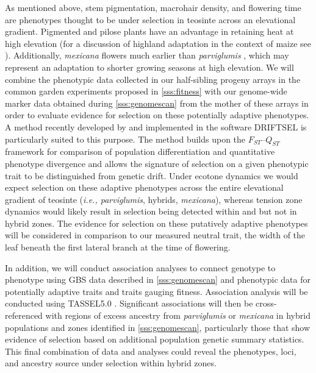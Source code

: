 As mentioned above, stem pigmentation, macrohair density, and flowering time are phenotypes thought to be under selection in teosinte across an elevational gradient.
Pigmented and pilose plants have an advantage in retaining heat at high elevation (for a discussion of highland adaptation in the context of maize see \citealt{Eagles1994}).
Additionally, \emph{mexicana} flowers much earlier than \emph{parviglumis} \citep{Rodriguez2006}, which may represent an adaptation to shorter growing seasons at high elevation.
We will combine the phenotypic data collected in our half-sibling progeny arrays in the common garden experiments proposed in \ref{sss:fitness} with our genome-wide marker data obtained during \ref{sss:genomescan} from the mother of these arrays in order to evaluate evidence for selection on these potentially adaptive phenotypes.
A method recently developed by \citet{Ovaskainen2011} and implemented in the software DRIFTSEL \citep{Karhunen2013} is particularly suited to this purpose.
The method builds upon the $F_{ST}$--$Q_{ST}$ framework \citep{leinonen2013} for comparison of population differentiation and quantitative phenotype divergence and allows the signature of selection on a given phenotypic trait to be distinguished from genetic drift.
Under ecotone dynamics we would expect selection on these adaptive phenotypes across the entire elevational gradient of teosinte (\emph{i.e., parviglumis}, hybrids, \emph{mexicana}), whereas tension zone dynamics would likely result in selection being detected within \zp{} and \zm{} but not in hybrid zones.
The evidence for selection on these putatively adaptive phenotypes will be considered in comparison to our measured neutral trait, the width of the leaf beneath the first lateral branch at the time of flowering.

In addition, we will conduct association analyses to connect genotype to phenotype using GBS data described in \ref{sss:genomescan} and phenotypic data for potentially adaptive traits and traits gauging fitness.
Association analysis will be conducted using TASSEL5.0 \citep{Bradbury2007}. Significant associations will then be cross-referenced with regions of excess ancestry from \emph{parviglumis} or \emph{mexicana} in hybrid populations and zones identified in \ref{sss:genomescan}, particularly those that show evidence of selection based on additional population genetic summary statistics.
This final combination of data and analyses could reveal the phenotypes, loci, and ancestry source under selection within hybrid zones.

